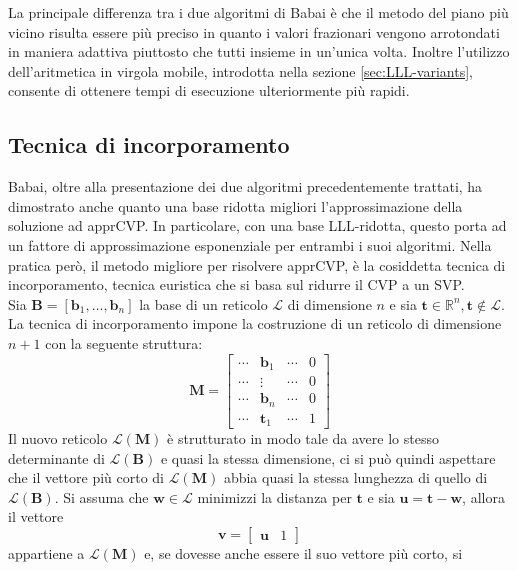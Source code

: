 La principale differenza tra i due algoritmi di Babai è che il metodo del piano più vicino
risulta essere più preciso in quanto i valori frazionari vengono arrotondati in maniera
adattiva piuttosto che tutti insieme in un'unica volta. Inoltre l'utilizzo dell'aritmetica in virgola mobile, 
introdotta nella sezione \ref{sec:LLL-variants}, consente di ottenere tempi di esecuzione 
ulteriormente più rapidi.


\subsection{Tecnica di incorporamento}
\label{sec:embedding}
Babai, oltre alla presentazione dei due algoritmi precedentemente trattati, ha dimostrato
anche quanto una base ridotta migliori l'approssimazione della soluzione ad apprCVP.
In particolare, con una base LLL-ridotta, questo porta ad un fattore di approssimazione
esponenziale per entrambi i suoi algoritmi. Nella pratica però, il metodo migliore per 
risolvere apprCVP, è la cosiddetta tecnica di
incorporamento\cite{Galbraith18}, tecnica euristica che si basa sul ridurre il CVP a un SVP.  
\\
Sia $\mathbf{B} = [\mathbf{b}_1,\dots, \mathbf{b}_n]$ la base di un reticolo $\mathcal{L}$
di dimensione $n$ e sia $\mathbf{t} \in \mathbb{R}^n, \mathbf{t} \notin \mathcal{L}$. 
La tecnica di incorporamento impone la costruzione di un reticolo di dimensione $n+1$ con
la seguente struttura:
\[
    \mathbf{M} =
    \begin{bmatrix}
        \cdots & \mathbf{b}_1 & \cdots & 0\\
        \cdots & \vdots &  \cdots &  0\\
        \cdots & \mathbf{b}_n & \cdots & 0\\
        \cdots & \mathbf{t}_1 & \cdots & 1
    \end{bmatrix}
\]
Il nuovo reticolo $\mathcal{L}(\mathbf{M})$ è strutturato in modo tale da avere lo stesso 
determinante di $\mathcal{L}(\mathbf{B})$ e quasi la stessa dimensione, ci si può quindi 
aspettare che il vettore più corto di $\mathcal{L}(\mathbf{M})$ abbia quasi la stessa 
lunghezza di quello di $\mathcal{L}(\mathbf{B})$. Si assuma che $\mathbf{w} \in \mathcal{L}$
minimizzi la distanza per $\mathbf{t}$ e sia $\mathbf{u} = \mathbf{t}-\mathbf{w}$, allora il vettore
\[
    \mathbf{v} =
    \begin{bmatrix}
        \mathbf{u} & 1
    \end{bmatrix}
\]
appartiene a $\mathcal{L}(\mathbf{M})$ e, se dovesse anche essere il suo vettore più corto, si 
